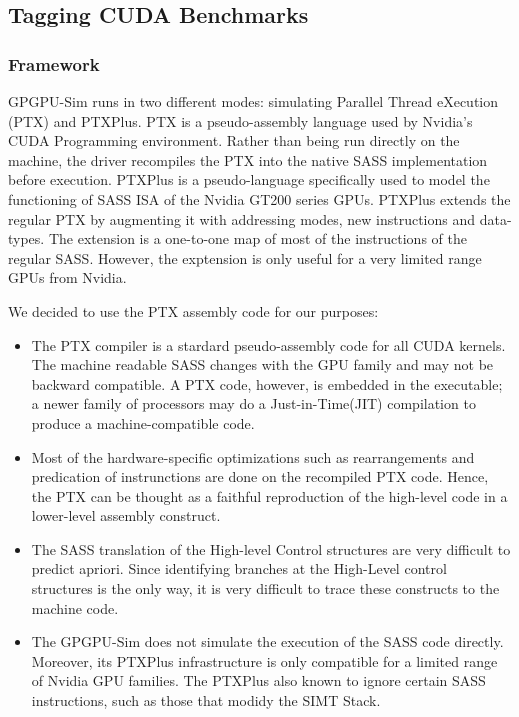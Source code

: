 %
%

\subsection{Tagging CUDA Benchmarks}
	
	\subsubsection*{Framework}	%
	GPGPU-Sim runs in two different modes: simulating Parallel Thread eXecution (PTX) and PTXPlus. PTX is a pseudo-assembly
language used by Nvidia's CUDA Programming environment. Rather than being run directly on the machine, the driver recompiles the
PTX into the native SASS implementation before execution. 
PTXPlus is a pseudo-language specifically used to model the functioning of SASS ISA of the Nvidia GT200 series GPUs. PTXPlus extends
the regular PTX by augmenting it with addressing modes, new instructions and data-types. The extension is a one-to-one map of most of
 the instructions of the regular SASS. However, the exptension is only useful for a very limited range GPUs from Nvidia. 
 
	We decided to use the PTX assembly code for our purposes:
	\begin{itemize}
	\item The PTX compiler is a stardard pseudo-assembly code for all CUDA kernels. The machine readable SASS changes with
	the GPU family and may not be backward compatible. A PTX code, however, is embedded in the executable; a newer
	family of processors may do a Just-in-Time(JIT) compilation to produce a machine-compatible code. 
	\item Most of the hardware-specific optimizations such as rearrangements and predication of instrunctions are done on the 
	recompiled PTX code. Hence, the PTX can be thought as a faithful reproduction of the high-level code in a lower-level
	assembly construct.
	\item The SASS translation of the High-level Control structures are very difficult to predict apriori. Since identifying
	branches at the High-Level control structures is the only way, it is very difficult to trace these constructs to the
	 machine code.
	\item The GPGPU-Sim does not simulate the execution of the SASS code directly. Moreover, its PTXPlus infrastructure is only
	compatible for a limited range of Nvidia GPU families. The PTXPlus also known to ignore certain SASS instructions, such as
	those that modidy the SIMT Stack. 
	\end{itemize}
		
